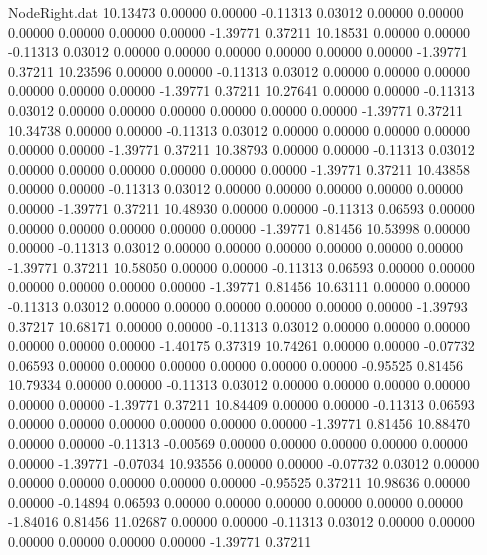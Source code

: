 \begin{filecontents}{NodeRight.dat}
  10.13473    0.00000    0.00000    -0.11313    0.03012    0.00000    0.00000    0.00000    0.00000    0.00000    0.00000   -1.39771    0.37211
  10.18531    0.00000    0.00000    -0.11313    0.03012    0.00000    0.00000    0.00000    0.00000    0.00000    0.00000   -1.39771    0.37211
  10.23596    0.00000    0.00000    -0.11313    0.03012    0.00000    0.00000    0.00000    0.00000    0.00000    0.00000   -1.39771    0.37211
  10.27641    0.00000    0.00000    -0.11313    0.03012    0.00000    0.00000    0.00000    0.00000    0.00000    0.00000   -1.39771    0.37211
  10.34738    0.00000    0.00000    -0.11313    0.03012    0.00000    0.00000    0.00000    0.00000    0.00000    0.00000   -1.39771    0.37211
  10.38793    0.00000    0.00000    -0.11313    0.03012    0.00000    0.00000    0.00000    0.00000    0.00000    0.00000   -1.39771    0.37211
  10.43858    0.00000    0.00000    -0.11313    0.03012    0.00000    0.00000    0.00000    0.00000    0.00000    0.00000   -1.39771    0.37211
  10.48930    0.00000    0.00000    -0.11313    0.06593    0.00000    0.00000    0.00000    0.00000    0.00000    0.00000   -1.39771    0.81456
  10.53998    0.00000    0.00000    -0.11313    0.03012    0.00000    0.00000    0.00000    0.00000    0.00000    0.00000   -1.39771    0.37211
  10.58050    0.00000    0.00000    -0.11313    0.06593    0.00000    0.00000    0.00000    0.00000    0.00000    0.00000   -1.39771    0.81456
  10.63111    0.00000    0.00000    -0.11313    0.03012    0.00000    0.00000    0.00000    0.00000    0.00000    0.00000   -1.39793    0.37217
  10.68171    0.00000    0.00000    -0.11313    0.03012    0.00000    0.00000    0.00000    0.00000    0.00000    0.00000   -1.40175    0.37319
  10.74261    0.00000    0.00000    -0.07732    0.06593    0.00000    0.00000    0.00000    0.00000    0.00000    0.00000   -0.95525    0.81456
  10.79334    0.00000    0.00000    -0.11313    0.03012    0.00000    0.00000    0.00000    0.00000    0.00000    0.00000   -1.39771    0.37211
  10.84409    0.00000    0.00000    -0.11313    0.06593    0.00000    0.00000    0.00000    0.00000    0.00000    0.00000   -1.39771    0.81456
  10.88470    0.00000    0.00000    -0.11313   -0.00569    0.00000    0.00000    0.00000    0.00000    0.00000    0.00000   -1.39771   -0.07034
  10.93556    0.00000    0.00000    -0.07732    0.03012    0.00000    0.00000    0.00000    0.00000    0.00000    0.00000   -0.95525    0.37211
  10.98636    0.00000    0.00000    -0.14894    0.06593    0.00000    0.00000    0.00000    0.00000    0.00000    0.00000   -1.84016    0.81456
  11.02687    0.00000    0.00000    -0.11313    0.03012    0.00000    0.00000    0.00000    0.00000    0.00000    0.00000   -1.39771    0.37211

\end{filecontents}
